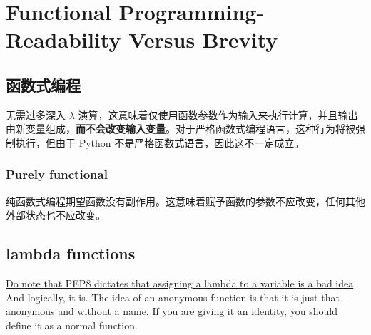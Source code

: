 \chapter{Functional Programming-Readability Versus Brevity\label{Ch05}}
\section{函数式编程}
无需过多深入 $\lambda$ 演算，这意味着仅使用函数参数作为输入来执行计算，并且输出由新变量组成，\textbf{而不会改变输入变量}。对于严格函数式编程语言，这种行为将被强制执行，但由于 Python 不是严格函数式语言，因此这不一定成立。
\subsection{Purely functional}
纯函数式编程期望函数没有副作用。这意味着赋予函数的参数不应改变，任何其他外部状态也不应改变。
\section{lambda functions}
\href{https://peps.python.org/pep-0008/#programming-recommendations}{Do note that PEP8 dictates that assigning a lambda to a variable is a bad idea}. And logically, it is. The idea of an anonymous function is that it is just that—anonymous and without a name. If you are giving it an identity, you should define it as a normal function.